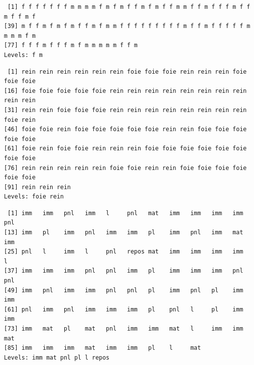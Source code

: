 \documentclass[
  a4paper,
  DIV=11,
  numbers=noendperiod,
  oneside]{scrreprt}
\newenvironment{Shaded}{}{}
\newcommand{\NormalTok}[1]{\textcolor[rgb]{0.14,0.16,0.18}{#1}}
\newcommand{\SpecialCharTok}[1]{\textcolor[rgb]{0.00,0.36,0.77}{#1}}
\begin{document}
\begin{Shaded}
\end{Shaded}

\begin{verbatim}
 [1] f f f f f f f m m m m f m f m f f m f m f f m m f f m f f f m f f m f f m f
[39] m f f m f m f m f f m f m m f f f f f f f f f m f f m f f f f f m m m m f m
[77] f f f m f f f m f m m m m m f f m
Levels: f m
\end{verbatim}

\begin{Shaded}
\end{Shaded}

\begin{verbatim}
 [1] rein rein rein rein rein rein foie foie foie rein rein rein foie foie foie
[16] foie foie foie foie foie rein rein rein rein rein rein rein rein rein rein
[31] rein rein foie foie foie rein rein rein rein rein rein rein rein foie rein
[46] foie foie rein foie foie foie foie foie rein rein foie foie foie foie foie
[61] foie rein foie foie rein rein rein foie foie foie foie foie foie foie foie
[76] rein rein rein rein rein foie foie rein rein foie foie foie foie foie foie
[91] rein rein rein
Levels: foie rein
\end{verbatim}

\begin{Shaded}
\end{Shaded}

\begin{verbatim}
 [1] imm   imm   pnl   imm   l     pnl   mat   imm   imm   imm   imm   pnl  
[13] imm   pl    imm   pnl   imm   imm   pl    imm   pnl   imm   mat   imm  
[25] pnl   l     imm   l     pnl   repos mat   imm   imm   imm   imm   l    
[37] imm   imm   imm   pnl   pnl   imm   pl    imm   imm   imm   pnl   pnl  
[49] imm   pnl   imm   imm   pnl   pnl   pl    imm   pnl   pl    imm   imm  
[61] pnl   imm   pnl   imm   imm   imm   pl    pnl   l     pl    imm   imm  
[73] imm   mat   pl    mat   pnl   imm   imm   mat   l     imm   imm   mat  
[85] imm   imm   imm   mat   imm   imm   pl    l     mat  
Levels: imm mat pnl pl l repos
\end{verbatim}
\end{document}
